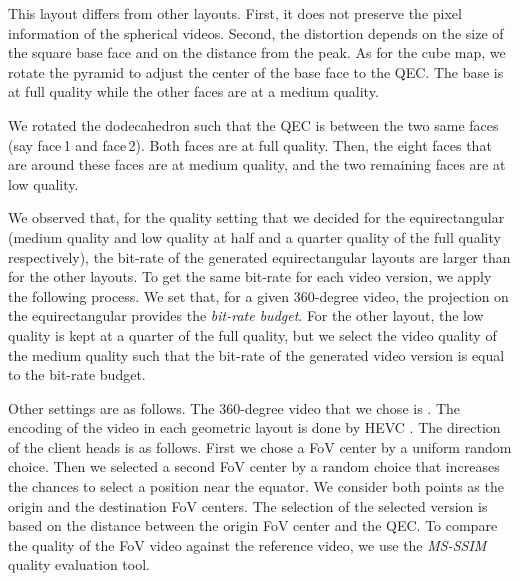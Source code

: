 This layout differs from other layouts. First, it does not preserve
the pixel information of the spherical videos. Second, the distortion depends on the size of the square
base face and on the distance from the peak. As for the cube map, we rotate the pyramid to adjust
the center of the base face to the \ac{QEC}. The base is at full quality while the other faces are
at a medium quality. 

We rotated the dodecahedron such that the \ac{QEC} is between
the two same faces (say face\,1 and face\,2). Both faces are at full quality. Then, the eight
faces that are around
these faces are at medium quality, and the two remaining faces are at low quality.

We observed that, for the quality setting that we decided for the equirectangular (medium quality and
low quality at half and a quarter quality of the full quality respectively), the bit-rate of the
generated equirectangular layouts are larger than for the other layouts. To get the
same bit-rate for each video version, we apply the following process. We set that, for a given
360-degree video, the projection on the equirectangular provides the \emph{bit-rate budget}. For the
other layout, the low quality is kept at a quarter of the full quality, but we select the video quality of the medium quality such that the bit-rate of the generated video version is equal to the
bit-rate budget.

Other settings are as follows.
The 360-degree video that we chose is . The encoding of the video in each
geometric layout is done by HEVC . The direction of the client heads is as follows.
First we chose a \ac{FoV} center by a uniform random choice. Then we selected a second \ac{FoV} center
by a random choice that increases the chances to select a position near the equator. We consider
both points as the origin and the destination \ac{FoV} centers. The selection of the selected version
is based on the distance between the origin \ac{FoV} center and the \ac{QEC}. To compare the
quality of the \ac{FoV} video against the reference video, we use the \emph{MS-SSIM} quality
evaluation tool.
